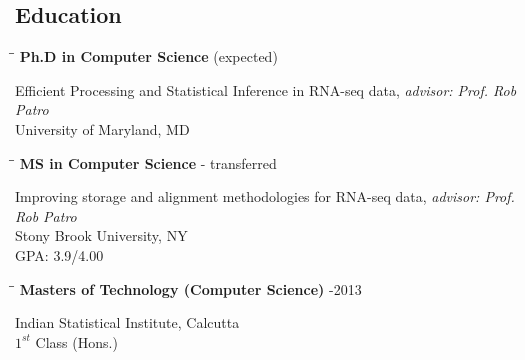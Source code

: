 \documentclass{res}
\begin{document}
\begin{resume}

\section{Education}          
  \vspace{-0.1in}	
   \begin{tabbing}
   \hspace{2.3in}\= \hspace{2.6in}\= \kill %
    {\bf Ph.D in Computer Science} \>    (expected)
   \end{tabbing}  \vspace{-20pt}      %
      Efficient Processing and Statistical Inference in RNA-seq data, {\it advisor: Prof. Rob Patro}  \\        
       University of Maryland, MD     
       
\vspace{-0.1in}	
   \begin{tabbing}
   \hspace{2.3in}\= \hspace{2.6in}\= \kill %
     {\bf MS in Computer Science} \>     - transferred
   \end{tabbing}  \vspace{-20pt}      %
        Improving storage and alignment methodologies for RNA-seq data, {\it advisor: Prof. Rob Patro}  \\        
       Stony Brook University, NY     \\
       GPA: 3.9/4.00
 
 \vspace{-0.1in}	
   \begin{tabbing}
   \hspace{2.3in}\= \hspace{2.6in}\= \kill %
     {\bf Masters of Technology (Computer Science)}  \>     -2013 
   \end{tabbing}  \vspace{-20pt}      %
       Indian Statistical Institute, Calcutta   \\
       $1^{st}$ Class (Hons.) 



\end{resume}
\end{document}
